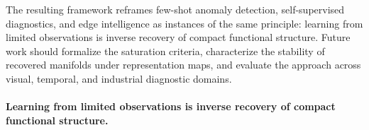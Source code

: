 \documentclass[11pt,a4paper]{article}
\begin{document}
The resulting framework reframes few-shot anomaly detection, self-supervised diagnostics, and edge intelligence as instances of the same principle: learning from limited observations is inverse recovery of compact functional structure. Future work should formalize the saturation criteria, characterize the stability of recovered manifolds under representation maps, and evaluate the approach across visual, temporal, and industrial diagnostic domains.

\paragraph{Learning from limited observations is inverse recovery of compact functional structure.
}



\end{document}
